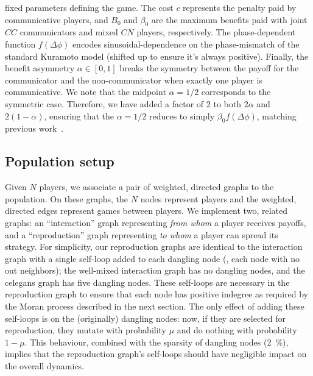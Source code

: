 \documentclass[10pt,letterpaper]{article}
\begin{document}
fixed parameters defining the game.
The cost $c$ represents the penalty paid by communicative players,
and $B_0$ and $\beta_0$ are the maximum benefits paid with
joint $CC$ communicators and mixed $CN$ players, respectively.
The phase-dependent function $f(\Delta \phi)$ encodes
sinusoidal-dependence on the phase-mismatch of the standard Kuramoto
model (shifted up to ensure it's always positive).
Finally, the benefit asymmetry $\alpha \in [0,1]$ breaks the symmetry
between the payoff for the communicator and the non-communicator
when exactly one player is communicative.
We note that the midpoint $\alpha = 1/2$ corresponds to the symmetric
case.
Therefore, we have added a factor of $2$ to both $2 \alpha$ and
$2(1-\alpha)$, ensuring that the $\alpha=1/2$ reduces to simply $\beta_0
f(\Delta \phi)$, matching previous work~\cite{tripp2022evolutionary}.

\subsection{Population setup}\label{sec:pop_setup}

Given $N$ players, we associate a pair
of weighted, directed graphs to the population.
On these graphs, the $N$ nodes represent players
and the weighted, directed edges represent games between players.
We implement two, related graphs:
an ``interaction'' graph representing
\emph{from whom} a player receives payoffs,
and a ``reproduction'' graph representing
\emph{to whom} a player can spread its strategy.
For simplicity, our reproduction graphs are identical to the interaction graph
with a single self-loop added to each dangling node (\ie{}, each node
with no out neighbors);
the well-mixed interaction graph has no dangling nodes,
and the \gls{celegans} graph has five dangling nodes.
These self-loops are necessary in the reproduction graph
to ensure that each node has positive indegree
as required by the Moran process described in the next section.
The only effect of adding these self-loops is on the (originally)
dangling nodes: now, if they are selected for reproduction,
they mutate with probability $\mu$ and do nothing with probability
$1-\mu$.
This behaviour, combined with the sparsity of dangling nodes
(\SI{2}{\percent}), implies that the reproduction graph's self-loops
should have negligible impact on the overall dynamics.
\end{document}
